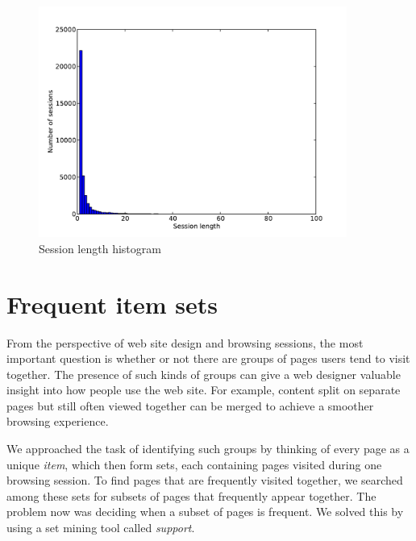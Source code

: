 \documentclass[english,a4paper]{article}
\begin{document}
\begin{figure}[H]
  \centering
      \includegraphics[width=0.9\textwidth]{session_len}
  \caption{Session length histogram}
  \label{session_len}
\end{figure}

















\section{Frequent item sets} 
From the perspective of web site design and browsing sessions, the most important question is whether or not there are groups of pages users tend to visit together. The presence of such kinds of groups can give a web designer valuable insight into how people use the web site. For example, content split on separate pages but still often viewed together can be merged to achieve a smoother browsing experience.

We approached the task of identifying such groups by thinking of every page as a unique \emph{item}, which then form sets, each containing pages visited during one browsing session. To find pages that are frequently visited together, we searched among these sets for subsets of pages that frequently appear together. The problem now was deciding when a subset of pages is frequent. We solved this by using a set mining \cite{frequent_item_set_mining} tool called \emph{support}.
\end{document}
